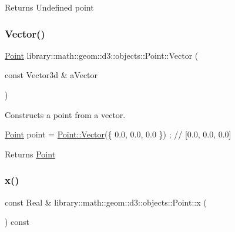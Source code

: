 \begin{DoxyReturn}{Returns}
Undefined point 
\end{DoxyReturn}
\mbox{\label{classlibrary_1_1math_1_1geom_1_1d3_1_1objects_1_1_point_a399551f0293c17de16fedb3e526cee04}} 
\subsubsection{\texorpdfstring{Vector()}{Vector()}}
{\footnotesize\ttfamily \hyperlink{classlibrary_1_1math_1_1geom_1_1d3_1_1objects_1_1_point}{Point} library\+::math\+::geom\+::d3\+::objects\+::\+Point\+::\+Vector (\begin{DoxyParamCaption}\item[{const Vector3d \&}]{a\+Vector }\end{DoxyParamCaption})\hspace{0.3cm}{\ttfamily [static]}}



Constructs a point from a vector. 


\begin{DoxyCode}
\hyperlink{classlibrary_1_1math_1_1geom_1_1d3_1_1objects_1_1_point_a617e690ab6091af3de729cee337e309e}{Point} point = \hyperlink{classlibrary_1_1math_1_1geom_1_1d3_1_1objects_1_1_point_a399551f0293c17de16fedb3e526cee04}{Point::Vector}(\{ 0.0, 0.0, 0.0 \}) ; \textcolor{comment}{// [0.0, 0.0, 0.0]}
\end{DoxyCode}


\begin{DoxyReturn}{Returns}
\hyperlink{classlibrary_1_1math_1_1geom_1_1d3_1_1objects_1_1_point}{Point} 
\end{DoxyReturn}
\mbox{\label{classlibrary_1_1math_1_1geom_1_1d3_1_1objects_1_1_point_a6a850887daa11135e062026b146eb1e9}} 
\subsubsection{\texorpdfstring{x()}{x()}}
{\footnotesize\ttfamily const Real \& library\+::math\+::geom\+::d3\+::objects\+::\+Point\+::x (\begin{DoxyParamCaption}{ }\end{DoxyParamCaption}) const}



